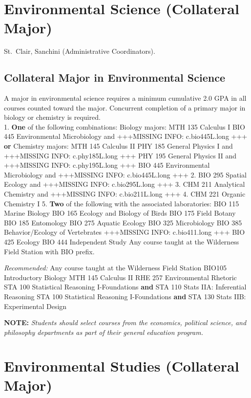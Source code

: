 \documentclass[
  letterpaper,
]{scrbook}
\begin{document}
\section{Environmental Science (Collateral
Major)}\label{sec-environmental-science}

St.~Clair, Sanchini (Administrative Coordinators).

\subsection{Collateral Major in Environmental
Science}\label{collateral-major-in-environmental-science}

A major in environmental science requires a minimum cumulative 2.0 GPA
in all courses counted toward the major. Concurrent completion of a
primary major in biology or chemistry is required.\\
1. \textbf{One} of the following combinations: Biology majors: MTH 135
Calculus I BIO 445 Environmental Microbiology and +++MISSING INFO:
c.bio445L.long +++ \textbf{or} Chemistry majors: MTH 145 Calculus II PHY
185 General Physics I and +++MISSING INFO: c.phy185L.long +++ PHY 195
General Physics II and +++MISSING INFO: c.phy195L.long +++ BIO 445
Environmental Microbiology and +++MISSING INFO: c.bio445L.long +++ 2.
BIO 295 Spatial Ecology and +++MISSING INFO: c.bio295L.long +++ 3. CHM
211 Analytical Chemistry and +++MISSING INFO: c.bio211L.long +++ 4. CHM
221 Organic Chemistry I 5. \textbf{Two} of the following with the
associated laboratories: BIO 115 Marine Biology BIO 165 Ecology and
Biology of Birds BIO 175 Field Botany BIO 185 Entomology BIO 275 Aquatic
Ecology BIO 325 Microbiology BIO 385 Behavior/Ecology of Vertebrates
+++MISSING INFO: c.bio411.long +++ BIO 425 Ecology BIO 444 Independent
Study Any course taught at the Wilderness Field Station with BIO prefix.

\emph{Recommended:} Any course taught at the Wilderness Field Station
BIO105 Introductory Biology MTH 145 Calculus II RHE 257 Environmental
Rhetoric STA 100 Statistical Reasoning I-Foundations \textbf{and} STA
110 Stats IIA: Inferential Reasoning STA 100 Statistical Reasoning
I-Foundations \textbf{and} STA 130 Stats IIB: Experimental Design

\textbf{NOTE:} \emph{Students should select courses from the economics,
political science, and philosophy departments as part of their general
education program.}

\section{Environmental Studies (Collateral
Major)}\label{sec-environmental-studies}
\end{document}
